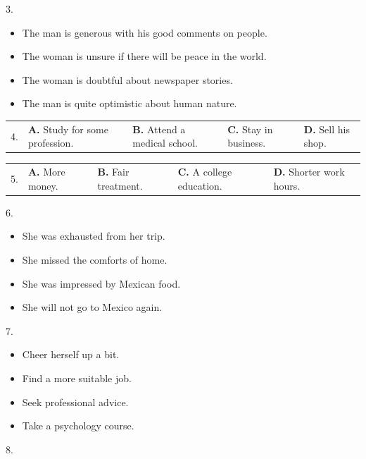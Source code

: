 \documentclass[UTF8,11pt]{ctexart}
\begin{document}
3.


\begin{itemize}[leftmargin=2em,itemsep=.2em,topsep=.4em]\item[A.] The man is generous with his good comments on people.
\item[B.] The woman is unsure if there will be peace in the world.
\item[C.] The woman is doubtful about newspaper stories.
\item[D.] The man is quite optimistic about human nature.
\end{itemize}

\noindent\begin{tabularx}{\linewidth}{@{}lXXXX@{}}4. & \textbf{A.} Study for some profession. & \textbf{B.} Attend a medical school. & \textbf{C.} Stay in business. & \textbf{D.} Sell his shop.\\\end{tabularx}\par

\noindent\begin{tabularx}{\linewidth}{@{}lXXXX@{}}5. & \textbf{A.} More money. & \textbf{B.} Fair treatment. & \textbf{C.} A college education. & \textbf{D.} Shorter work hours.\\\end{tabularx}\par

6.


\begin{itemize}[leftmargin=2em,itemsep=.2em,topsep=.4em]\item[A.] She was exhausted from her trip.
\item[B.] She missed the comforts of home.
\item[C.] She was impressed by Mexican food.
\item[D.] She will not go to Mexico again.
\end{itemize}

7.


\begin{itemize}[leftmargin=2em,itemsep=.2em,topsep=.4em]\item[A.] Cheer herself up a bit.
\item[B.] Find a more suitable job.
\item[C.] Seek professional advice.
\item[D.] Take a psychology course.
\end{itemize}

8.
\end{document}
